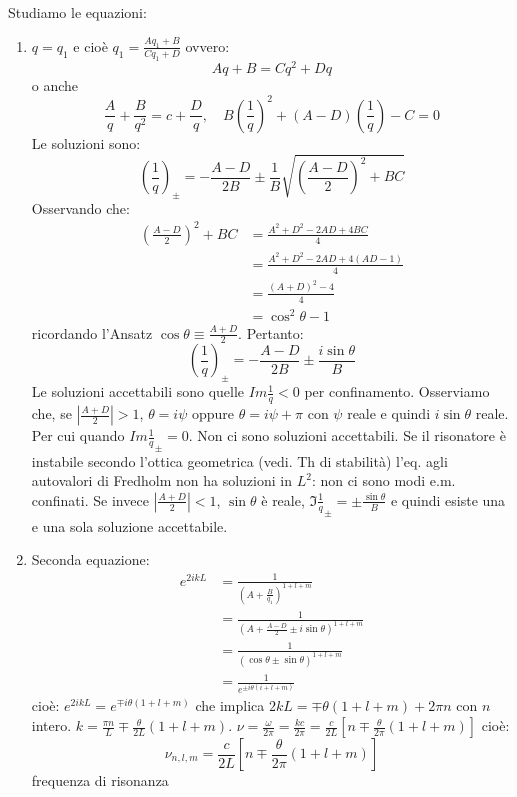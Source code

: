 \documentclass{book}
\theoremstyle{remark}
\begin{document}
Studiamo le equazioni:
\begin{enumerate}
\item $q=q_1$ e cioè $q_1 = \frac{Aq_1 + B}{Cq_1 + D}$ ovvero:
\begin{equation*}
Aq + B = Cq^2 + Dq
\end{equation*}
o anche
\begin{equation*}
\frac{A}{q} + \frac{B}{q^2} = c +\frac{D}{q}, \quad B\left(\frac{1}{q}\right)^2 + (A-D)\left(\frac{1}{q}\right) -C = 0
\end{equation*}
Le soluzioni sono:
\begin{equation*}
\left(\frac{1}{q}\right)_{\pm} = -\frac{A-D}{2B} \pm \frac{1}{B}\sqrt{\left(\frac{A-D}{2}\right)^2 + BC}
\end{equation*}
Osservando che:
\begin{align*}
\left(\frac{A-D}{2}\right)^2 + BC &= \frac{A^2 +D^2 -2AD + 4BC}{4}\\
&= \frac{A^2 + D^2 - 2AD + 4(AD-1)}{4}\\
&= \frac{(A+D)^2 -4}{4}\\
&= \cos^2\theta -1 
\end{align*}
ricordando l'Ansatz $\cos\theta \equiv \frac{A+D}{2}$.
Pertanto:
\begin{equation*}
\left(\frac{1}{q}\right)_{\pm} = - \frac{A-D}{2B} \pm \frac{i\sin\theta}{B}
\end{equation*}
Le soluzioni accettabili sono quelle $Im{\frac{1}{q}}<0$ per confinamento. Osserviamo che, se $\left|\frac{A+D}{2}\right|>1$, $\theta = i\psi$ oppure $\theta=i\psi +\pi$ con $\psi$ reale e quindi $i\sin\theta$ reale. Per cui quando $Im{\frac{1}{q}}_\pm = 0$. Non ci sono soluzioni accettabili.
Se il risonatore è instabile secondo l'ottica geometrica (vedi. Th di stabilità) l'eq. agli autovalori di Fredholm non ha soluzioni in $L^2$: non ci sono modi e.m. confinati.
Se invece $\left|\frac{A+D}{2}\right|<1$, $\sin\theta$ è reale, $\Im{\frac{1}{q}_\pm}= \pm\frac{\sin\theta}{B}$ e quindi esiste una e una sola soluzione accettabile.
\item Seconda equazione:
\begin{align*}
e^{2ikL} &= \frac{1}{\left(A + \frac{B}{q_1}\right)^{1+l+m}}\\
&= \frac{1}{\left(A + \frac{A-D}{2}\pm i\sin\theta\right)^{1+l+m}}\\
&= \frac{1}{\left(\cos \theta \pm \sin \theta\right)^{1+l+m}}\\
&= \frac{1}{e^{\pm i\theta(i+l+m)}}
\end{align*}
cioè:
$e^{2ikL} = e^{\mp i\theta(1+l+m)}$ che implica $2kL = \mp \theta(1+l+m) + 2\pi n$ con $n$ intero. $k = \frac{\pi n}{L} \mp \frac{\theta}{2L}(1+l+m)$. $\nu = \frac{\omega}{2\pi} = \frac{kc}{2\pi} = \frac{c}{2L} \left[n \mp \frac{\theta}{2\pi}(1+l+m)\right]$
cioè:
\begin{equation*}
\nu_{n,l,m} = \frac{c}{2L} \left[n \mp \frac{\theta}{2\pi}(1+l+m)\right]
\end{equation*}
frequenza di risonanza


\end{enumerate}
\end{document}
